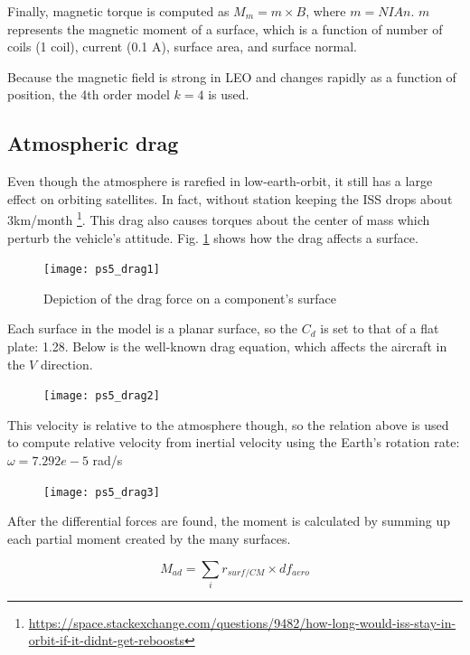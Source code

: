 \documentclass[12pt, letterpaper]{article}
\begin{document}
Finally, magnetic torque is computed as $M_m = m\times B$, where $m=NIAn$. $m$ represents the magnetic moment of a surface, which is a function of number of coils (1 coil), current (0.1 A), surface area, and surface normal.

Because the magnetic field is strong in LEO and changes rapidly as a function of position, the 4th order model $k=4$ is used.

\subsection{Atmospheric drag}

Even though the atmosphere is rarefied in low-earth-orbit, it still has a large effect on orbiting satellites. In fact, without station keeping the ISS drops about 3km/month \footnote{\url{https://space.stackexchange.com/questions/9482/how-long-would-iss-stay-in-orbit-if-it-didnt-get-reboosts}}. This drag also causes torques about the center of mass which perturb the vehicle's attitude. Fig. \ref{5:drag1} shows how the drag affects a surface.

\begin{figure}[H]
	\centering
	\texttt{[image: ps5\_drag1]}
	\caption{Depiction of the drag force on a component's surface}
	\label{5:drag1}
\end{figure}

Each surface in the model is a planar surface, so the $C_d$ is set to that of a flat plate: 1.28. Below is the well-known drag equation, which affects the aircraft in the $V$ direction.

\begin{figure}[H]
	\centering
	\texttt{[image: ps5\_drag2]}
\end{figure}

This velocity is relative to the atmosphere though, so the relation above is used to compute relative velocity from inertial velocity using the Earth's rotation rate: $\omega=7.292e-5$ rad/s

\begin{figure}[H]
	\centering
	\texttt{[image: ps5\_drag3]}
\end{figure}

After the differential forces are found, the moment is calculated by summing up each partial moment created by the many surfaces.

\begin{equation}
M_{ad}=\sum _i r_{surf/CM} \times df_{aero}
\end{equation}
\end{document}
